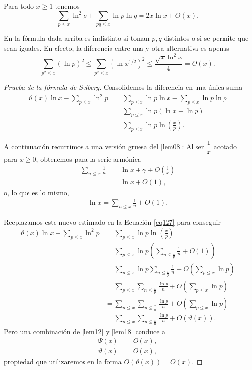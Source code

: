 \begin{theorem}\label{the22}
Para todo $x \geq 1$ tenemos
\[
\sum_{p \leq x} \ln^2 p + \sum_{pq \leq x} \ln p \ln q = 2x\ln x + O(x).
\]
\end{theorem}

\begin{note}
En la f\'ormula dada arriba es indistinto si toman $p,q$ distintos o si se permite que sean iguales. 
En efecto, la diferencia entre una y otra alternativa es apenas  
\[
\sum_{p^2 \le x} (\ln p)^2 \le \sum_{p^2 \le x} (\ln x^{1/2})^2 \le \frac{\sqrt{x} \ln^2 x}{4}= O(x).  
\]
\end{note}

\begin{proof}[Prueba de la f\'ormula de Selberg]
Consolidemos la diferencia en una \'unica suma 
\begin{align}
\vartheta(x)\ln x - \sum_{p \leq x} \ln^2 p &= \sum_{p \leq x} \ln p \ln x - \sum_{p \leq x} \ln p \ln p \\
&= \sum_{p \leq x} \ln p (\ln x - \ln p) \\
&= \sum_{p \leq x} \ln p \ln \left(\frac{x}{p}\right).\label{eq127}
\end{align}

A continuaci\'on recurrimos a una versi\'on gruesa del \cref{lem08}:
Al ser $\dfrac{1}{x}$ acotado para $x \ge 0$, obtenemos  para la serie arm\'onica 
\begin{align}
\sum_{n \leq x} \frac{1}{n} &= \ln x + \gamma + O\left(\frac{1}{x}\right) \\
&= \ln x + O(1),  
\end{align}
o, lo que es lo mismo, 
\begin{align}
\ln x = \sum_{n \leq x} \frac{1}{n} + O(1). 
\end{align}

Reeplazamos este nuevo estimado en la Ecuaci\'on \ref{eq127} para conseguir 
\begin{align}
\vartheta(x)\ln x - \sum_{p \leq x} \ln^2 p &= \sum_{p \leq x} \ln p \ln \left(\frac{x}{p}\right) \\
&= \sum_{p \leq x} \ln p \left(\sum_{n \leq \frac{x}{p}} \frac{1}{n} + O(1)\right) \\
&= \sum_{p \leq x} \ln p \sum_{n \leq \frac{x}{p}} \frac{1}{n} + O\left(\sum_{p \leq x} \ln p\right) \\
&= \sum_{p \leq x} \sum_{n \leq \frac{x}{p}} \frac{\ln p}{n} + O\left(\sum_{p \leq x} \ln p\right) \\
&= \sum_{n \leq x} \sum_{p \leq \frac{x}{n}} \frac{\ln p}{n} + O\left(\sum_{p \leq x} \ln p\right) \\
&= \sum_{n \leq x} \sum_{p \leq \frac{x}{n}} \frac{\ln p}{n} + O(\vartheta(x)).\label{eq136}
\end{align}
Pero una combinaci\'on de \cref{lem12} y \cref{lem18} conduce a 
\begin{align}
\Psi(x) &= O(x),  \\
\vartheta(x) &= O(x),
\end{align}
propiedad que utilizaremos en la forma $O(\vartheta(x))=O(x)$.


\end{proof}
